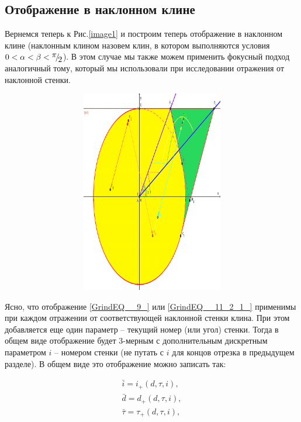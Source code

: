 \documentclass[a4paper]{article}
\begin{document}
\subsection{ Отображение в наклонном клине}

Вернемся теперь к Рис.\ref{image1} и построим теперь отображение в наклонном клине (наклонным клином назовем клин, в котором выполняются условия $0<\alpha <\beta <{\raise0.7ex\hbox{$ \pi  $}\!\mathord{\left/ {\vphantom {\pi  2}} \right. \kern-\nulldelimiterspace}\!\lower0.7ex\hbox{$ 2 $}} $). В этом случае мы также можем применить фокусный подход аналогичный тому, который мы использовали при исследовании отражения от наклонной стенки.
\begin{figure}[ht]
  \centering
  \includegraphics[width=123.3mm, height=88.8mm, viewport=3mm 4mm 205mm 292mm]{image10}\\
  \caption{}\label{image10}
\end{figure}

Ясно, что отображение \eqref{GrindEQ__9_} или \eqref{GrindEQ__11_2_1_}  применимы при каждом отражении от соответствующей наклонной стенки клина. При этом добавляется еще один параметр -- текущий номер (или угол) стенки. Тогда в общем виде отображение будет 3-мерным с дополнительным дискретным параметром $i$ -- номером стенки (не путать с $i$ для концов отрезка в предыдущем разделе). В общем виде это отображение можно записать так:

\begin{equation} \label{GrindEQ__20_} \begin{array}{l} {\bar{i}=i_{+} \left(d,\tau ,i\right),} \\ {\bar{d}=d_{+} \left(d,\tau ,i\right),} \\ {\bar{\tau }=\tau _{+} \left(d,\tau ,i\right),} \end{array} \end{equation}
\end{document}
